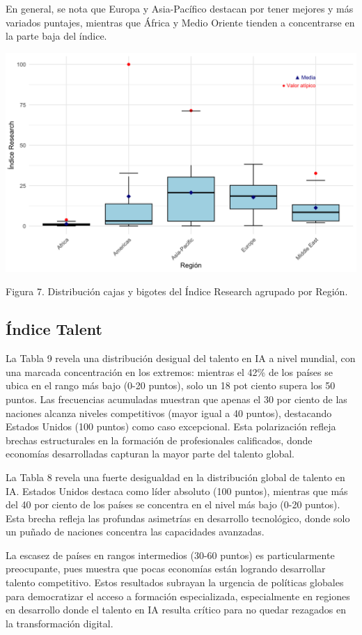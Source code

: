 \documentclass[
]{article}
\begin{document}
\begin{multicols}{2}
En general, se nota que Europa y Asia-Pacífico destacan por tener mejores y más variados puntajes, mientras que África y Medio Oriente tienden a concentrarse en la parte baja del índice.



\begin{center}
\includegraphics[width=\linewidth]{figura7.png}
\end{center}
Figura 7. Distribución cajas y bigotes del Índice Research agrupado por Región.


\subsection{Índice Talent}

La Tabla 9 revela una distribución desigual del talento en IA a nivel mundial, con una marcada concentración en los extremos: mientras el 42\% de los países se ubica en el rango más bajo (0-20 puntos), solo un 18 pot ciento supera los 50 puntos. Las frecuencias acumuladas muestran que apenas el 30 por ciento de las naciones alcanza niveles competitivos (mayor igual a 40 puntos), destacando Estados Unidos (100 puntos) como caso excepcional. Esta polarización refleja brechas estructurales en la formación de profesionales calificados, donde economías desarrolladas capturan la mayor parte del talento global.

La Tabla 8 revela una fuerte desigualdad en la distribución global de talento en IA. Estados Unidos destaca como líder absoluto (100 puntos), mientras que más del 40 por ciento de los países se concentra en el nivel más bajo (0-20 puntos). Esta brecha refleja las profundas asimetrías en desarrollo tecnológico, donde solo un puñado de naciones concentra las capacidades avanzadas.

La escasez de países en rangos intermedios (30-60 puntos) es particularmente preocupante, pues muestra que pocas economías están logrando desarrollar talento competitivo. Estos resultados subrayan la urgencia de políticas globales para democratizar el acceso a formación especializada, especialmente en regiones en desarrollo donde el talento en IA resulta crítico para no quedar rezagados en la transformación digital.

\end{multicols}
\end{document}

